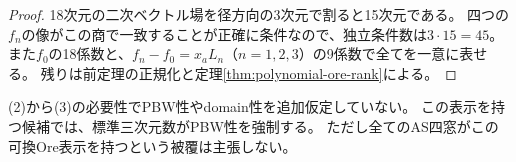 \begin{proof}
18次元の二次ベクトル場を径方向の3次元で割ると15次元である。
四つの$f_n$の像がこの商で一致することが正確に条件なので、独立条件数は$3\cdot15=45$。
また$f_0$の18係数と、$f_n-f_0=x_aL_n$（$n=1,2,3$）の9係数で全てを一意に表せる。
残りは前定理の正規化と定理\ref{thm:polynomial-ore-rank}による。
\end{proof}
\begin{remark}
(2)から(3)の必要性でPBW性やdomain性を追加仮定していない。
この表示を持つ候補では、標準三次元数がPBW性を強制する。
ただし全てのAS四窓がこの可換Ore表示を持つという被覆は主張しない。
\end{remark}
